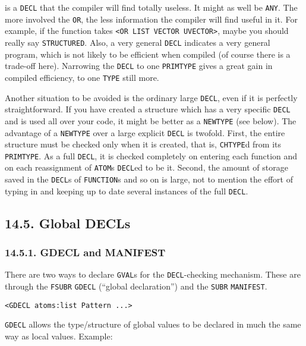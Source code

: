 \documentclass[a4paper,]{article}
\begin{document}
is a \texttt{DECL} that the compiler will find totally useless. It might as well be \texttt{ANY}. The more involved the
\texttt{OR}, the less information the compiler will find useful in it. For example, if the function takes
\texttt{\textless{}OR\ LIST\ VECTOR\ UVECTOR\textgreater{}}, maybe you should really say \texttt{STRUCTURED}. Also, a very
general \texttt{DECL} indicates a very general program, which is not likely to be efficient when compiled (of course there
is a trade-off here). Narrowing the \texttt{DECL} to one \texttt{PRIMTYPE} gives a great gain in compiled efficiency, to
one \texttt{TYPE} still more.

Another situation to be avoided is the ordinary large \texttt{DECL}, even if it is perfectly straightforward. If you have
created a structure which has a very specific \texttt{DECL} and is used all over your code, it might be better as a
\texttt{NEWTYPE} (see below). The advantage of a \texttt{NEWTYPE} over a large explicit \texttt{DECL} is twofold. First,
the entire structure must be checked only when it is created, that is, \texttt{CHTYPE}d from its \texttt{PRIMTYPE}. As a
full \texttt{DECL}, it is checked completely on entering each function and on each reassignment of \texttt{ATOM}s
\texttt{DECL}ed to be it. Second, the amount of storage saved in the \texttt{DECL}s of \texttt{FUNCTION}s and so on is
large, not to mention the effort of typing in and keeping up to date several instances of the full \texttt{DECL}.

\subsection{14.5. Global DECLs}\label{global-decls}

\subsubsection{14.5.1. GDECL and MANIFEST}\label{gdecl-and-manifest}

There are two ways to declare \texttt{GVAL}s for the \texttt{DECL}-checking mechanism. These are through the
\texttt{FSUBR} \texttt{GDECL}  (``global declaration'') and the
\texttt{SUBR} \texttt{MANIFEST}.

\begin{verbatim}
<GDECL atoms:list Pattern ...>
\end{verbatim}

\texttt{GDECL} allows the type/structure of global values to be declared in much the same way as local values. Example:
\end{document}
